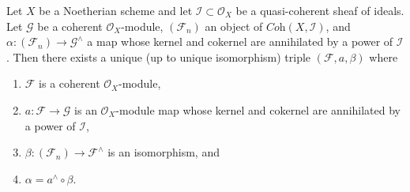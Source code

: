 \begin{lemma}
\label{lemma-existence-easy}
Let $X$ be a Noetherian scheme and let $\mathcal{I} \subset \mathcal{O}_X$
be a quasi-coherent sheaf of ideals. Let $\mathcal{G}$ be a coherent
$\mathcal{O}_X$-module, $(\mathcal{F}_n)$ an object of
$\textit{Coh}(X, \mathcal{I})$, and
$\alpha : (\mathcal{F}_n) \to \mathcal{G}^\wedge$
a map whose kernel and cokernel are annihilated by a power of $\mathcal{I}$.
Then there exists a unique (up to unique isomorphism) triple
$(\mathcal{F}, a, \beta)$ where
\begin{enumerate}
\item $\mathcal{F}$ is a coherent $\mathcal{O}_X$-module,
\item $a : \mathcal{F} \to \mathcal{G}$ is an $\mathcal{O}_X$-module map
whose kernel and cokernel are annihilated by a power of $\mathcal{I}$,
\item $\beta : (\mathcal{F}_n) \to \mathcal{F}^\wedge$ is an isomorphism, and
\item $\alpha = a^\wedge \circ \beta$.
\end{enumerate}
\end{lemma}

